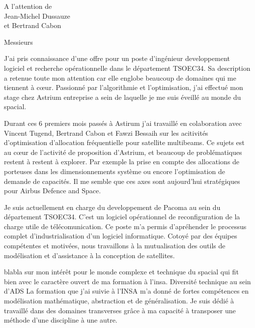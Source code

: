\documentclass[12pt]{lettre}
\begin{document}
\begin{letter}{A l'attention de\\Jean-Michel Dussauze\\et Bertrand Cabon}
\address{Victor Cameo Ponz\\16 rue Payras\\31000 Toulouse}
\nofax

\opening{Messieurs}
{%
J'ai pris connaissance d'une offre pour un poste d'ingénieur developpement logiciel et recherche opérationnelle dans le département TSOEC34.
Sa description a retenue toute mon attention car elle englobe beaucoup de domaines qui me tiennent à c\oe{}ur.
Passionné par l'algorithmie et l'optimisation, j'ai effectué mon stage chez Astrium entreprise a sein de laquelle je me suis éveillé au monde du spacial.
}

{%
Durant ces 6 premiers mois passés à Astirum j'ai travaillé en colaboration
avec Vincent Tugend, Bertrand Cabon et Fawzi Bessaih sur les acitivités
d'optimisation d'allocation fréquentielle pour satellite multibeams.
Ce sujets est au cœur de l'activité de proposition d'Astrium,
et beaucoup de problématiques restent à restent à explorer.
Par exemple la prise en compte des allocations de porteuses dans les
dimensionnements système ou encore l'optimisation de demande de capacités.
Il me semble que ces axes sont aujourd'hui stratégiques pour Airbus Defence and Space.
}

{%
Je suis actuellement en charge du developpement de Pacoma au sein du département TSOEC34.
C'est un logiciel opérationnel de reconfiguration de la charge utile de télécomunication.
Ce poste m'a permis d'apréhender le processus complet d'industrialisation d'un logiciel informatique.
Cotoyé par des équipes compétentes et motivées, nous travaillons à la
mutualisation des outils de modélisation et d'assistance à la conception de satellites.
}

{%
blabla sur mon intérêt pour le monde complexe et technique du spacial qui fit bien avec le caractère ouvert de ma formation à l'insa. Diversité technique au sein d'ADS
La formation que j'ai suivie à l'INSA m'a donné de fortes compétences en modélisation mathématique, abstraction et de généralisation. Je suis dédié à travaillé dans des domaines transverses grâce à ma capacité à transposer une méthode d'une discipline à une autre.
}


\end{letter}
\end{document}
